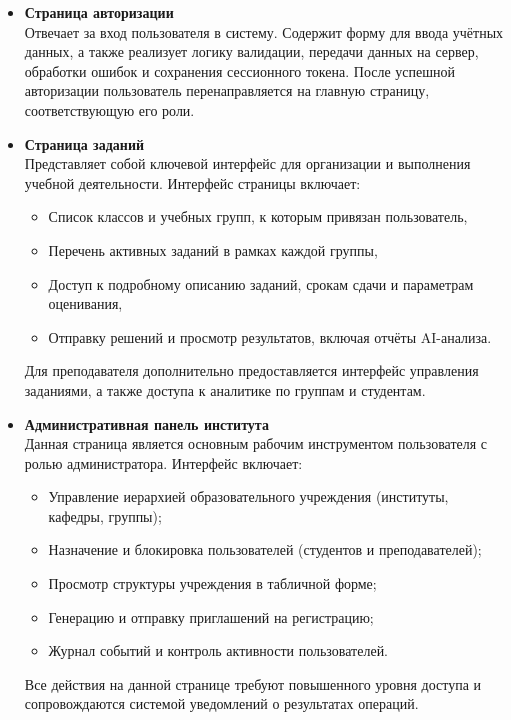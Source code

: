 \begin{itemize}
  \item \textbf{Страница авторизации}\\  
  Отвечает за вход пользователя в систему. Содержит форму для ввода учётных данных, а также реализует логику валидации, передачи данных на сервер, обработки ошибок и сохранения сессионного токена. После успешной авторизации пользователь перенаправляется на главную страницу, соответствующую его роли.

  \item \textbf{Страница заданий}\\
  Представляет собой ключевой интерфейс для организации и выполнения учебной деятельности. Интерфейс страницы включает:
  \begin{itemize}
    \item Список классов и учебных групп, к которым привязан пользователь,
    \item Перечень активных заданий в рамках каждой группы,
    \item Доступ к подробному описанию заданий, срокам сдачи и параметрам оценивания,
    \item Отправку решений и просмотр результатов, включая отчёты AI-анализа.
  \end{itemize}
  Для преподавателя дополнительно предоставляется интерфейс управления заданиями, а также доступа к аналитике по группам и студентам.

  \item \textbf{Административная панель института}\\
  Данная страница является основным рабочим инструментом пользователя с ролью администратора. Интерфейс включает:
  \begin{itemize}
    \item Управление иерархией образовательного учреждения (институты, кафедры, группы);
    \item Назначение и блокировка пользователей (студентов и преподавателей);
    \item Просмотр структуры учреждения в табличной форме;
    \item Генерацию и отправку приглашений на регистрацию;
    \item Журнал событий и контроль активности пользователей.
  \end{itemize}
  Все действия на данной странице требуют повышенного уровня доступа и сопровождаются системой уведомлений о результатах операций.


\end{itemize}
